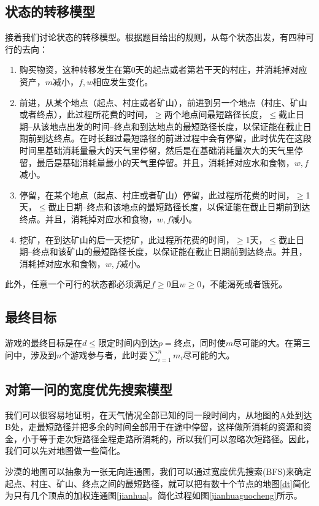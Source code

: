 \documentclass[withoutpreface,bwprint]{cumcmthesis} %
\begin{document}
\subsection{状态的转移模型}
接着我们讨论状态的转移模型。根据题目给出的规则，从每个状态出发，有四种可行的去向：
\begin{enumerate}
    \item 购买物资，这种转移发生在第0天的起点或者第若干天的村庄，并消耗掉对应资产，\(m\)减小，\(f,w\)相应发生变化。
    \item 前进，从某个地点（起点、村庄或者矿山），前进到另一个地点（村庄、矿山或者终点），此过程所花费的时间，\(\geq\)两个地点间最短路径长度，\(\leq\)截止日期--从该地点出发的时间--终点和到达地点的最短路径长度，以保证能在截止日期前到达终点。在时长超过最短路径的前进过程中会有停留，此时优先在这段时间里基础消耗量最大的天气里停留，然后是在基础消耗量次大的天气里停留，最后是基础消耗量最小的天气里停留。并且，消耗掉对应水和食物，\(w,f\)减小。
    \item 停留，在某个地点（起点、村庄或者矿山）停留，此过程所花费的时间，\(\geq\)1天，\(\leq\)截止日期--终点和该地点的最短路径长度，以保证能在截止日期前到达终点。并且，消耗掉对应水和食物，\(w,f\)减小。
    \item 挖矿，在到达矿山的后一天挖矿，此过程所花费的时间，\(\geq\)1天，\(\leq\)截止日期--终点和该矿山的最短路径长度，以保证能在截止日期前到达终点。并且，消耗掉对应水和食物，\(w,f\)减小。
\end{enumerate}
此外，任意一个可行的状态都必须满足\(f\geq 0\)且\(w\geq 0\)，不能渴死或者饿死。

\subsection{最终目标}

游戏的最终目标是在\(d\leq\)限定时间内到达\(p=\)终点，同时使\(m\)尽可能的大。在第三问中，涉及到\(n\)个游戏参与者，此时要\(\sum_{i=1}^n m_i\)尽可能的大。

\subsection{对第一问的宽度优先搜索模型}

我们可以很容易地证明，在天气情况全部已知的同一段时间内，从地图的A处到达B处，走最短路径并把多余的时间全部用于在途中停留，这样做所消耗的资源和资金，小于等于走次短路径全程走路所消耗的，所以我们可以忽略次短路径。因此，我们可以先对地图做一些简化。

沙漠的地图可以抽象为一张无向连通图，我们可以通过宽度优先搜索(BFS)来确定起点、村庄、矿山、终点之间的最短路径，就可以把有数十个节点的地图\ref{dt}简化为只有几个顶点的加权连通图\ref{jianhua}。简化过程如图\ref{jianhuaguocheng}所示。
\end{document}
